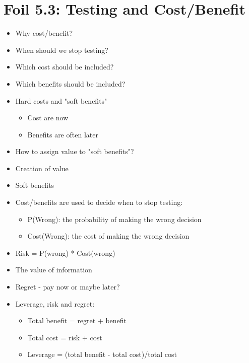 	\section{Foil 5.3: Testing and Cost/Benefit}
		\begin{itemize}
			\item Why cost/benefit?
			\item When should we stop testing?
			\item Which cost should be included?
			\item Which benefits should be included?
			\item Hard costs and "soft benefits"
				\begin{itemize}		
				 	\item Cost are now
				 	\item Benefits are often later 
				 \end{itemize}
			\item How to assign value to "soft benefits"?
			\item Creation of value
			\item Soft benefits
			\item Cost/benefits are used to decide when to stop testing:
				\begin{itemize}
					\item P(Wrong): the probability of making the wrong decision
					\item Cost(Wrong): the cost of making the wrong decision
				\end{itemize}
			\item Risk = P(wrong) * Cost(wrong)
			\item The value of information
			\item Regret - pay now or maybe later?
			\item Leverage, risk and regret: 
				\begin{itemize}
					\item Total benefit = regret + benefit
					\item Total cost = risk + cost
					\item Leverage = (total benefit - total cost)/total cost
				\end{itemize}
		\end{itemize}



